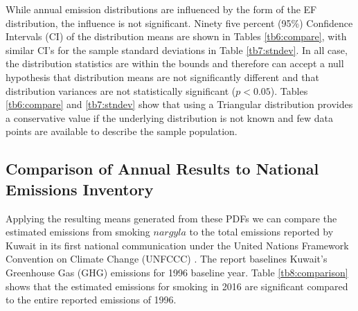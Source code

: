 %
\begin{table}[]
\centering
\caption{Comparison of annual total emission standard deviations.}
\label{tb7:stndev}
\end{table}

While annual emission distributions are influenced by the form of the EF distribution, the influence is not significant. Ninety five percent (95\%) Confidence Intervals (CI) of the distribution means are shown in Tables \ref{tb6:compare}, with similar CI’s for the sample standard deviations in Table \ref{tb7:stndev}. In all case, the distribution statistics are within the bounds and therefore can accept a null hypothesis that distribution means are not significantly different and that distribution variances are not statistically significant ($p<0.05$).  Tables \ref{tb6:compare} and \ref{tb7:stndev} show that using a Triangular distribution provides a conservative value if the underlying distribution is not known and few data points are available to describe the sample population.  

\subsection{Comparison of Annual Results to National Emissions Inventory}
Applying the resulting means generated from these PDFs we can compare the estimated emissions from smoking $nargyla$ to the total emissions reported by Kuwait in its first national communication under the United Nations Framework Convention on Climate Change (UNFCCC) \citep{AlMudhhi2012}.  The report baselines Kuwait’s Greenhouse Gas (GHG) emissions for 1996 baseline year.  Table \ref{tb8:comparison} shows that the estimated emissions for smoking in 2016 are significant compared to the entire reported emissions of 1996. 

